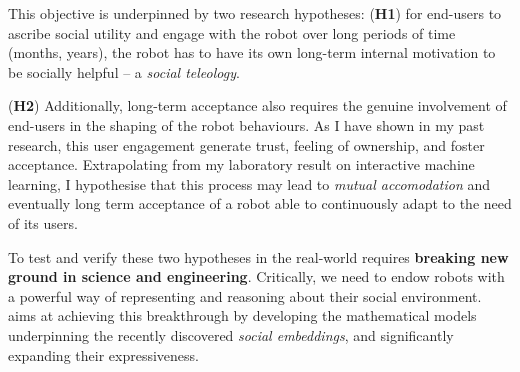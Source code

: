 This objective is underpinned by two research hypotheses: (\textbf{H1}) for
end-users to ascribe social utility and engage with the robot over long periods
of time (months, years), the robot has to have its own long-term internal
motivation to be socially helpful -- a \emph{social teleology}.

(\textbf{H2}) Additionally, long-term acceptance also requires the
genuine involvement of end-users in the shaping of the robot behaviours. As I
have shown in my past research, this user engagement generate trust, feeling of
ownership, and foster acceptance. Extrapolating from my laboratory result on
interactive machine learning, I hypothesise that this process may lead to
\emph{mutual accomodation} and eventually long term acceptance of a robot able
to continuously adapt to the need of its users.

To test and verify these two hypotheses in the real-world requires
\textbf{breaking new ground in science and engineering}. Critically, we need to
endow robots with a powerful way of representing and reasoning about their
social environment.  \project aims at achieving this breakthrough by developing
the mathematical models underpinning the recently discovered \emph{social
embeddings}, and significantly expanding their expressiveness.


